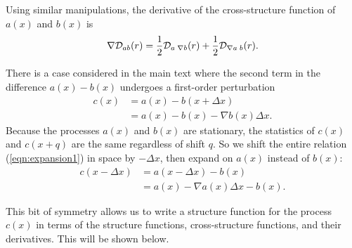 \documentclass[11pt, oneside]{article}   	%
\begin{document}
\begin{appendix}
Using similar manipulations, the derivative of the cross-structure function of $a(x)$ and $b(x)$ is
\begin{equation}
\label{eqn:derivCross}
\nabla {\cal D}_{ab}(r) = \frac{1}{2} {\cal D}_{a \; \nabla b}(r) + \frac{1}{2} {\cal D}_{\nabla a \; b}(r).
\end{equation}

There is a case considered in the main text where the second term in the difference $a(x)-b(x)$ undergoes a first-order perturbation
\begin{align}
\label{eqn:expansion1}
c(x) &= a(x) - b(x+\Delta x) \nonumber \\
       &= a(x) - b(x) - \nabla b(x) \Delta x.
\end{align}
Because the processes $a(x)$ and $b(x)$ are stationary, the statistics of $c(x)$ and $c(x+q)$ are the same regardless of shift $q$. So we shift the entire relation (\ref{eqn:expansion1}) in space by $-\Delta x$, then expand on $a(x)$ instead of $b(x)$:
\begin{align}
\label{eqn:expansion2}
c(x-\Delta x) &= a(x-\Delta x) - b(x) \nonumber \\
                     &= a(x) - \nabla a(x) \Delta x - b(x).
\end{align}

This bit of symmetry allows us to write a structure function for the process $c(x)$ in terms of the structure functions, cross-structure functions, and their derivatives. This will be shown below.


\end{appendix}
\end{document}
